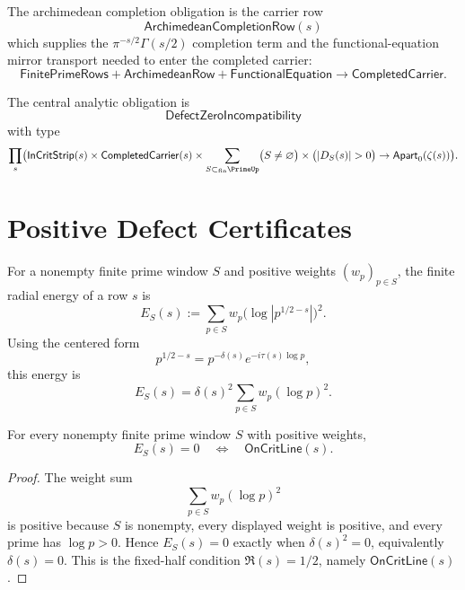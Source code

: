 \begin{definition}
\label{def:rh-archimedean-completion-obligation}
The archimedean completion obligation is the carrier row
$$
\mathsf{ArchimedeanCompletionRow}(s)
$$
which supplies the $\pi^{-s/2}\Gamma(s/2)$ completion term and the
functional-equation mirror transport needed to enter the completed carrier:
$$
\mathsf{FinitePrimeRows}
+
\mathsf{ArchimedeanRow}
+
\mathsf{FunctionalEquation}
\to
\mathsf{CompletedCarrier}.
$$
\end{definition}

\begin{definition}
\label{def:rh-defect-zero-incompatibility}
The central analytic obligation is
$$
\mathsf{DefectZeroIncompatibility}
$$
with type
$$
\prod_s
\bigl(
\mathsf{InCritStrip}(s)
\times
\mathsf{CompletedCarrier}(s)
\times
\sum_{S\subset_{\mathrm{fin}}\PrimeUp}
\bigl(S\ne\varnothing\bigr)\times\bigl(|D_S(s)|>0\bigr)
\to
\mathsf{Apart}_{0}(\zeta(s))
\bigr).
$$
\end{definition}

\section{Positive Defect Certificates}
\label{sec:rh-positive-defect-certificates}

\begin{definition}
\label{def:rh-finite-radial-energy}
For a nonempty finite prime window $S$ and positive weights
$(w_p)_{p\in S}$, the finite radial energy of a row $s$ is
$$
E_S(s)
:=
\sum_{p\in S}
w_p\bigl(\log |p^{1/2-s}|\bigr)^2.
$$
Using the centered form
$$
p^{1/2-s}=p^{-\delta(s)}e^{-i\tau(s)\log p},
$$
this energy is
$$
E_S(s)
=
\delta(s)^2
\sum_{p\in S}w_p(\log p)^2.
$$
\end{definition}

\begin{proposition}
\label{prop:rh-finite-radial-energy-detects-fixed-half}
For every nonempty finite prime window $S$ with positive weights,
$$
E_S(s)=0
\quad\Longleftrightarrow\quad
\mathsf{OnCritLine}(s).
$$
\end{proposition}

\begin{proof}
The weight sum
$$
\sum_{p\in S}w_p(\log p)^2
$$
is positive because $S$ is nonempty, every displayed weight is positive,
and every prime has $\log p>0$.  Hence
$E_S(s)=0$ exactly when $\delta(s)^2=0$, equivalently
$\delta(s)=0$.  This is the fixed-half condition
$\Re(s)=1/2$, namely $\mathsf{OnCritLine}(s)$.
\end{proof}

